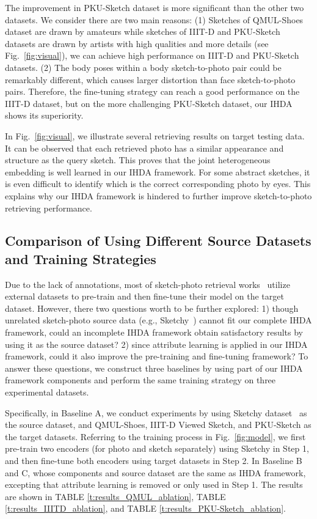 \documentclass[journal]{IEEEtran}
\begin{document}
The improvement in PKU-Sketch dataset is more significant than the other two datasets. We consider there are two main reasons: (1) Sketches of QMUL-Shoes dataset are drawn by amateurs while sketches of IIIT-D and PKU-Sketch datasets are drawn by artists with high qualities and more details (see Fig.~\ref{fig:visual}), we can achieve high performance on IIIT-D and PKU-Sketch datasets. (2) The body poses within a body sketch-to-photo pair could be remarkably different, which causes larger distortion than face sketch-to-photo pairs. Therefore, the fine-tuning strategy can reach a good performance on the IIIT-D dataset, but on the more challenging PKU-Sketch dataset, our IHDA shows its superiority.

In Fig.~\ref{fig:visual}, we illustrate several retrieving results on target testing data. It can be observed that each retrieved photo has a similar appearance and structure as the query sketch. This proves that the joint heterogeneous embedding is well learned in our IHDA framework. For some abstract sketches, it is even difficult to identify which is the correct corresponding photo by eyes. This explains why our IHDA framework is hindered to further improve sketch-to-photo retrieving performance. 


\subsection{Comparison of Using Different Source Datasets and Training Strategies }

Due to the lack of annotations, most of sketch-photo retrieval works~\cite{song2016deep, pang2018cross, song2017deep, parkhi2015deep, wu2018light, wu2018coupled, deng2019residual,SangkloyBHH16} utilize external datasets to pre-train and then fine-tune their model on the target dataset. However, there two questions worth to be further explored: 1) though unrelated sketch-photo source data (e.g., Sketchy~\cite{sangkloy2016sketchy}) cannot fit our complete IHDA framework, could an incomplete IHDA framework obtain satisfactory results by using it as the source dataset? 2) since attribute learning is applied in our IHDA framework, could it also improve the pre-training and fine-tuning framework? To answer these questions, we construct three baselines by using part of our IHDA framework components and perform the same training strategy on three experimental datasets.

Specifically, in Baseline A, we conduct experiments by using Sketchy dataset~\cite{sangkloy2016sketchy} as the source dataset, and QMUL-Shoes, IIIT-D Viewed Sketch, and PKU-Sketch as the target datasets. Referring to the training process in Fig.~\ref{fig:model}, we first pre-train two encoders (for photo and sketch separately) using Sketchy in Step 1, and then fine-tune both encoders using target datasets in Step 2. In Baseline B and C, whose components and source dataset are the same as IHDA framework, excepting that attribute learning is removed or only used in Step 1. The results are shown in TABLE \ref{t:results_QMUL_ablation}, TABLE \ref{t:results_IIITD_ablation}, and TABLE \ref{t:results_PKU-Sketch_ablation}.
\end{document}
